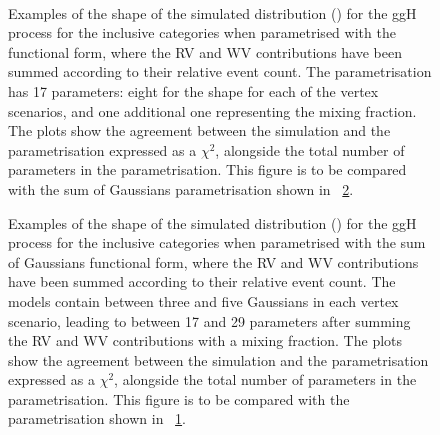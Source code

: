\begin{figure}[htp!]
\centering
 \\
\caption{Examples of the shape of the simulated \mgg distribution (\GeV) for the ggH process for the inclusive categories when parametrised with the \DCBpG functional form, where the RV and WV contributions have been summed according to their relative event count. The parametrisation has 17 parameters: eight for the \DCBpG shape for each of the vertex scenarios, and one additional one representing the mixing fraction. The plots show the agreement between the simulation and the parametrisation expressed as a $\chi^2$, alongside the total number of parameters in the parametrisation. This figure is to be compared with the sum of Gaussians parametrisation shown in \Fig~\ref{fig:model:functionalform_bis}.}

\label{fig:model:functionalform}
\end{figure}
\begin{figure}[htp!]
\centering
\caption{Examples of the shape of the simulated \mgg distribution (\GeV) for the ggH process for the inclusive categories when parametrised with the sum of Gaussians functional form, where the RV and WV contributions have been summed according to their relative event count. The models contain between three and five Gaussians in each vertex scenario, leading to between 17 and 29 parameters after summing the RV and WV contributions with a mixing fraction. The plots show the agreement between the simulation and the parametrisation expressed as a $\chi^2$, alongside the total number of parameters in the parametrisation. This figure is to be compared with the \DCBpG parametrisation shown in \Fig~\ref{fig:model:functionalform}.}

\label{fig:model:functionalform_bis}
\end{figure}
